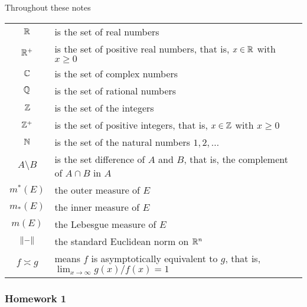 Throughout these notes

\begin{tabular}{cl}
  $\mathbb{R}$ & is the set of real numbers\\
  $\mathbb{R}^+$ & is the set of positive real numbers, that is, $x\in\mathbb{R}$ with
             $x\geq 0$\\
  $\mathbb{C}$ & is the set of complex numbers\\
  $\mathbb{Q}$ & is the set of rational numbers\\
  $\mathbb{Z}$ & is the set of the integers\\
  $\mathbb{Z}^+$ & is the set of positive integers, that is, $x\in\mathbb{Z}$ with
             $x\geq 0$\\
  $\mathbb{N}$ & is the set of the natural numbers $1,2,\ldots$\\
  $A\setminus B$ & is the set difference of $A$ and $B$, that is, the
                        complement of $A\cap B$ in $A$\\
  $m^*(E)$ & the outer measure of $E$\\
  $m_*(E)$ & the inner measure of $E$\\
  $m(E)$ & the Lebesgue measure of $E$\\
  $\|{-}\|$ & the standard Euclidean norm on $\mathbb{R}^n$\\
  $f\asymp g$ & means $f$ is asymptotically equivalent to $g$, that is,
                $\lim_{x\to\infty} g(x)/f(x)=1$\\
\end{tabular}

\newpage

\subsubsection{Homework 1}
\setcounter{exercise}{0}
\setcounter{equation}{0}

